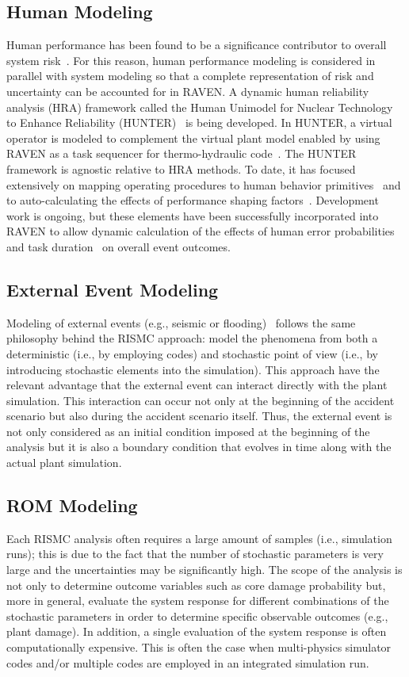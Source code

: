 \subsection{Human Modeling}
Human performance has been found to be a significance contributor to overall system 
risk~\cite{NUREG/CR-6753}. 
For this reason, human performance modeling is considered in parallel with system modeling so 
that a complete representation of risk and uncertainty can be accounted for in RAVEN. 
A dynamic human reliability analysis (HRA) framework called the Human Unimodel for 
Nuclear Technology to Enhance
Reliability (HUNTER)~\cite{boringHUNTER} is being developed. In HUNTER, a virtual operator is modeled to 
complement the virtual plant model enabled by using RAVEN as a task sequencer for thermo-hydraulic 
code~\cite{RasmussenAHFE2017}. The HUNTER framework is agnostic relative to HRA methods. To date, it has focused 
extensively on mapping operating procedures to human behavior primitives~\cite{GOMSHRA} and to
auto-calculating the effects of performance shaping factors~\cite{DynamicizingSPAR,RasmussenESREL2016}. 
Development work is
ongoing, but these elements have been successfully incorporated into RAVEN to allow dynamic 
calculation of the effects of human error probabilities~\cite{boringTaskProcedures} and task 
duration~\cite{boringOperatorTiming} on overall event outcomes.

\subsection{External Event Modeling}
Modeling of external events (e.g., seismic or flooding)~\cite{mandelliPSA2015} follows the same 
philosophy behind the RISMC
approach: model the phenomena from both a deterministic (i.e., by employing codes) and stochastic 
point of view (i.e., by introducing stochastic elements into the simulation). This approach have the 
relevant advantage that the external event can interact directly with the plant simulation. 
This interaction can occur not only at the beginning of the accident scenario but also
during the accident scenario itself. Thus, the external event is not only considered as an initial 
condition imposed at the beginning of the analysis but it is also a boundary condition that evolves in time 
along with the actual plant simulation.

\subsection{ROM Modeling}
Each RISMC analysis often requires a large amount of samples (i.e., simulation runs); this is due to the fact that the 
number of stochastic parameters is very large and the uncertainties may be significantly high. 
The scope of the analysis is not only to determine outcome variables such as core damage probability 
but, more in general, evaluate the system response for different combinations of the stochastic
parameters in order to determine specific observable outcomes (e.g., plant damage). In addition, 
a single evaluation of the system response is often computationally expensive. 
This is often the case when multi-physics simulator codes and/or multiple codes are employed in an 
integrated simulation run.


